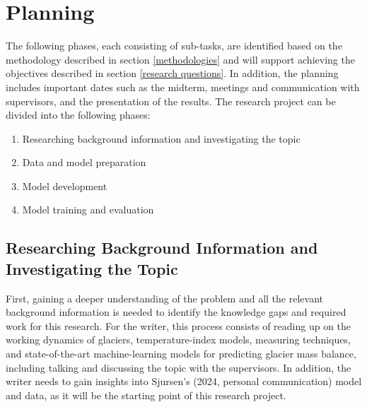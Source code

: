 \section{Planning}



The following phases, each consisting of sub-tasks, are identified based on the methodology described in section \ref{methodologies} and will support achieving the objectives described in section \ref{research questions}. In addition, the planning includes important dates such as the midterm, meetings and communication with supervisors, and the presentation of the results. The research project can be divided into the following phases:

\begin{enumerate}
    \item Researching background information and investigating the topic
    \item Data and model preparation
    \item Model development
    \item Model training and evaluation
\end{enumerate}

\subsection{Researching Background Information and Investigating the Topic}
First, gaining a deeper understanding of the problem and all the relevant background information is needed to identify the knowledge gaps and required work for this research. For the writer, this process consists of reading up on the working dynamics of glaciers, temperature-index models, measuring techniques, and state-of-the-art machine-learning models for predicting glacier mass balance, including talking and discussing the topic with the supervisors. In addition, the writer needs to gain insights into Sjursen's (2024, personal communication) model and data, as it will be the starting point of this research project.

